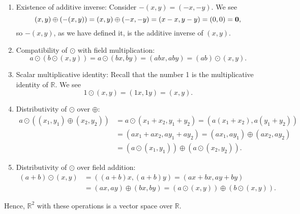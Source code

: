 \begin{sltn}
\begin{enumerate}
    \item Existence of additive inverse: Consider $ -(x,y)=(-x,-y) $. We see
    \begin{equation*}
        (x,y)\oplus(-(x,y))=(x,y)\oplus(-x,-y)=(x-x,y-y)=(0,0)=\mathbf{0},
    \end{equation*}
    so $ -(x,y) $, as we have defined it, is the additive inverse of $ (x,y) $.

    \item Compatibility of $ \odot $ with field multiplication:
    \begin{equation*}
        a\odot(b\odot(x,y))=a\odot(bx,by)=(abx,aby)=(ab)\odot(x,y).
    \end{equation*}

    \item Scalar multiplicative identity: Recall that the number 1 is the multiplicative identity of $ \mathbb{R} $. We see
    \begin{equation*}
        1\odot(x,y)=(1x,1y)=(x,y).
    \end{equation*}

    \item Distributivity of $ \odot $ over $ \oplus $:
    \begin{align*}
        a\odot((x_1,y_1)\oplus(x_2,y_2)) &= a\odot(x_1\!+x_2,y_1+y_2)=(a(x_1\!+x_2),a(y_1+y_2)) \\
        &= (ax_1\!+ax_2,ay_1+ay_2)=(ax_1,ay_1)\oplus(ax_2,ay_2) \\
        &= (a\odot(x_1,y_1))\oplus(a\odot(x_2,y_2)).
    \end{align*}

    \item Distributivity of $ \odot $ over field addition:
    \begin{align*}
        (a+b)\odot(x,y) &= ((a+b)x,(a+b)y)=(ax+bx,ay+by) \\
        &= (ax,ay)\oplus(bx,by)=(a\odot(x,y))\oplus(b\odot(x,y)).
    \end{align*}
\end{enumerate}
Hence, $ \mathbb{R}^2 $ with these operations is a vector space over $ \mathbb{R} $.
\end{sltn}

